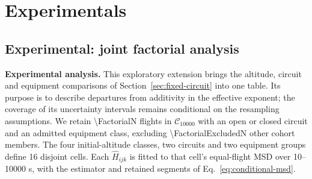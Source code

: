 \clearpage
\setcounter{chapter}{0}
\renewcommand{\thechapter}{E}
\renewcommand{\theHchapter}{experimentals}
\chapter*{Experimentals}
{}
\label{ch:experimentals}







\section{Experimental: joint factorial analysis}
\label{sec:conditional-factorial}

\noindent\textbf{Experimental analysis.}
This exploratory extension brings the altitude, circuit and equipment
comparisons of Section~\ref{sec:fixed-circuit} into one table. Its purpose is to
describe departures from additivity in the effective
exponent; the coverage of its uncertainty intervals remains conditional on the
resampling assumptions. We retain \num{\FactorialN} flights in
$\mathcal C_{10000}$ with an open or closed circuit and an admitted equipment
class, excluding \num{\FactorialExcludedN} other cohort members. The four
initial-altitude classes, two circuits and two equipment groups define 16
disjoint cells. Each $\widehat H_{ijk}$ is fitted to that cell's equal-flight MSD
over 10--10000 s, with the estimator and retained segments of
Eq.~\eqref{eq:conditional-msd}.

